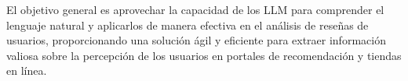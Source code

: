El objetivo general es aprovechar la capacidad de los LLM 
para comprender el lenguaje natural y aplicarlos de manera efectiva en el 
análisis de reseñas de usuarios, proporcionando una solución ágil y 
eficiente para extraer información valiosa sobre la 
percepción de los usuarios en portales de recomendación y tiendas en línea.